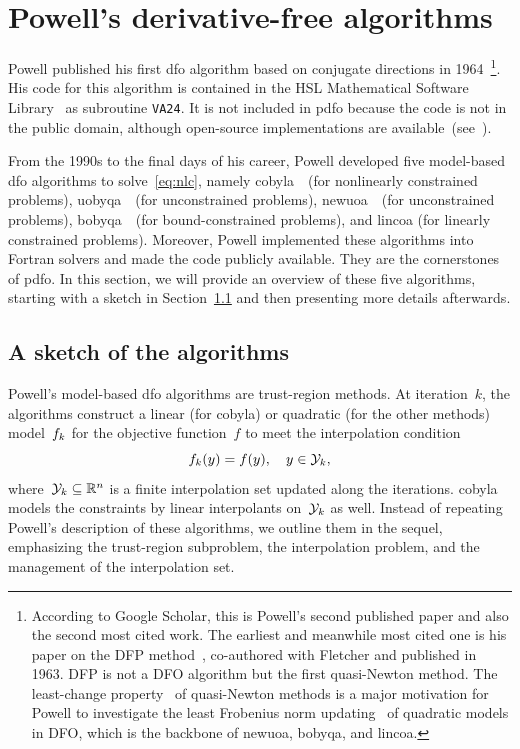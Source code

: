 \documentclass[
    smallextended,  %
    final,        %
]{svjour3}
\newcommand{\R}{\mathbb{R}}
\newcommand{\objm}[1][k]{\obj\ifthenelse{\equal{#1}{}}{}{_{#1}}}
\newcommand{\obj}{f}
\newcommand{\xpt}[1][k]{\mathcal{Y}\ifthenelse{\equal{#1}{}}{}{_{#1}}}
\begin{document}
\section{Powell's derivative-free algorithms}
\label{sec:powell}

Powell published his first \gls{dfo} algorithm based on conjugate directions in 1964~\cite{Powell_1964}\footnote{According to Google Scholar, this is Powell's second published paper and also the second most cited work.
The earliest and meanwhile most cited one is his paper on the DFP method~\cite{Fletcher_Powell_1963},
co-authored with Fletcher and published in 1963. DFP is not a DFO algorithm but the first
quasi-Newton method. The least-change property~\cite{Dennis_Schnabel_1979} of quasi-Newton methods
is a major motivation for Powell to investigate the least Frobenius norm updating~\cite{Powell_2004b}
of quadratic models in DFO, which is the backbone of \gls{newuoa}, \gls{bobyqa}, and \gls{lincoa}.}.
His code for this algorithm is contained in the HSL Mathematical Software Library~\cite{HSL} as subroutine \texttt{VA24}.
It is not included in \gls{pdfo} because the code is not in the public domain, although open-source implementations are available~(see~\cite[footnote~4]{Conn_Scheinberg_Toint_1997b}).

From the 1990s to the final days of his career, Powell developed five model-based \gls{dfo}
algorithms to solve~\eqref{eq:nlc}, namely \gls{cobyla}~\cite{Powell_1994}~(for nonlinearly
constrained problems), \gls{uobyqa}~\cite{Powell_2002}~(for unconstrained problems),
\gls{newuoa}~\cite{Powell_2006}~(for unconstrained problems), \gls{bobyqa}~\cite{Powell_2009}~(for
bound-constrained problems), and \gls{lincoa} (for linearly constrained problems).
Moreover, Powell implemented these algorithms into Fortran solvers and made the code publicly available.
They are the cornerstones of \gls{pdfo}.
In this section, we will provide an overview of these five algorithms, starting with a sketch in
Section~\ref{ssec:sketch} and then presenting more details afterwards.

\subsection{A sketch of the algorithms}
\label{ssec:sketch}

Powell's model-based \gls{dfo} algorithms are trust-region methods.
At iteration~$k$, the algorithms construct a linear (for \gls{cobyla}) or quadratic (for the other methods) model~$\objm$ for the objective function~$f$ to meet the interpolation condition
\begin{equation}
    \label{eq:itpls}
    \objm(y) = \obj(y), \quad y \in \xpt,
\end{equation}
where~$\xpt \subseteq \R^n$ is a finite interpolation set updated along the iterations.
\Gls{cobyla} models the constraints by linear interpolants on~$\xpt$ as well.
Instead of repeating Powell's description of these algorithms, we outline them in the sequel, emphasizing the trust-region subproblem, the interpolation problem, and the management of the interpolation set.
\end{document}
